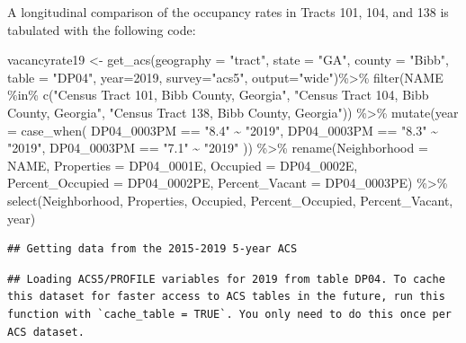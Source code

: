 \documentclass[
]{article}
\newenvironment{Shaded}{\begin{snugshade}}{\end{snugshade}}
\newcommand{\AttributeTok}[1]{\textcolor[rgb]{0.77,0.63,0.00}{#1}}
\newcommand{\DecValTok}[1]{\textcolor[rgb]{0.00,0.00,0.81}{#1}}
\newcommand{\FunctionTok}[1]{\textcolor[rgb]{0.00,0.00,0.00}{#1}}
\newcommand{\NormalTok}[1]{#1}
\newcommand{\OtherTok}[1]{\textcolor[rgb]{0.56,0.35,0.01}{#1}}
\newcommand{\SpecialCharTok}[1]{\textcolor[rgb]{0.00,0.00,0.00}{#1}}
\newcommand{\StringTok}[1]{\textcolor[rgb]{0.31,0.60,0.02}{#1}}
\begin{document}
A longitudinal comparison of the occupancy rates in Tracts 101, 104, and
138 is tabulated with the following code:

\begin{Shaded}
\begin{Highlighting}[]
\NormalTok{vacancyrate19 }\OtherTok{\textless{}{-}} \FunctionTok{get\_acs}\NormalTok{(}\AttributeTok{geography =} \StringTok{"tract"}\NormalTok{, }\AttributeTok{state =} \StringTok{"GA"}\NormalTok{, }\AttributeTok{county =} \StringTok{"Bibb"}\NormalTok{, }\AttributeTok{table =} \StringTok{"DP04"}\NormalTok{,  }\AttributeTok{year=}\DecValTok{2019}\NormalTok{, }\AttributeTok{survey=}\StringTok{"acs5"}\NormalTok{, }\AttributeTok{output=}\StringTok{"wide"}\NormalTok{)}\SpecialCharTok{\%\textgreater{}\%}
\FunctionTok{filter}\NormalTok{(NAME }\SpecialCharTok{\%in\%} \FunctionTok{c}\NormalTok{(}\StringTok{"Census Tract 101, Bibb County, Georgia"}\NormalTok{, }\StringTok{"Census Tract 104, Bibb County, Georgia"}\NormalTok{, }\StringTok{"Census Tract 138, Bibb County, Georgia"}\NormalTok{)) }\SpecialCharTok{\%\textgreater{}\%}
  \FunctionTok{mutate}\NormalTok{(}\AttributeTok{year =} \FunctionTok{case\_when}\NormalTok{(}
\NormalTok{    DP04\_0003PM }\SpecialCharTok{==} \StringTok{"8.4"} \SpecialCharTok{\textasciitilde{}} \StringTok{"2019"}\NormalTok{,}
\NormalTok{    DP04\_0003PM }\SpecialCharTok{==} \StringTok{"8.3"} \SpecialCharTok{\textasciitilde{}} \StringTok{"2019"}\NormalTok{,}
\NormalTok{    DP04\_0003PM }\SpecialCharTok{==} \StringTok{"7.1"} \SpecialCharTok{\textasciitilde{}} \StringTok{"2019"}
\NormalTok{  )) }\SpecialCharTok{\%\textgreater{}\%}
  \FunctionTok{rename}\NormalTok{(}\AttributeTok{Neighborhood =}\NormalTok{ NAME,}
         \AttributeTok{Properties =}\NormalTok{ DP04\_0001E,}
         \AttributeTok{Occupied =}\NormalTok{ DP04\_0002E,}
         \AttributeTok{Percent\_Occupied =}\NormalTok{ DP04\_0002PE,}
         \AttributeTok{Percent\_Vacant =}\NormalTok{ DP04\_0003PE) }\SpecialCharTok{\%\textgreater{}\%}
   \FunctionTok{select}\NormalTok{(Neighborhood, Properties, Occupied, Percent\_Occupied, Percent\_Vacant, year) }
\end{Highlighting}
\end{Shaded}

\begin{verbatim}
## Getting data from the 2015-2019 5-year ACS
\end{verbatim}

\begin{verbatim}
## Loading ACS5/PROFILE variables for 2019 from table DP04. To cache this dataset for faster access to ACS tables in the future, run this function with `cache_table = TRUE`. You only need to do this once per ACS dataset.
\end{verbatim}
\end{document}
